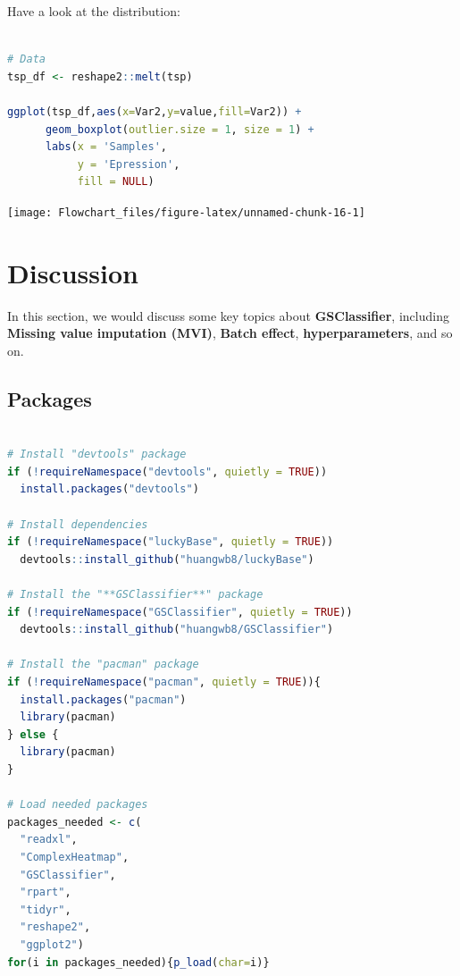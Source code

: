 \documentclass[
  12pt,
]{book}
\begin{document}
Have a look at the distribution:

\begin{lstlisting}[language=R]

# Data
tsp_df <- reshape2::melt(tsp)

ggplot(tsp_df,aes(x=Var2,y=value,fill=Var2)) + 
      geom_boxplot(outlier.size = 1, size = 1) + 
      labs(x = 'Samples',
           y = 'Epression',
           fill = NULL) 
\end{lstlisting}

\begin{center}\texttt{[image: Flowchart\_files/figure-latex/unnamed-chunk-16-1]} \end{center}

\hypertarget{discussion}{%
\chapter{Discussion}\label{discussion}}

In this section, we would discuss some key topics about \textbf{GSClassifier}, including \textbf{Missing value imputation (MVI)}, \textbf{Batch effect}, \textbf{hyperparameters}, and so on.

\hypertarget{packages-1}{%
\section{Packages}\label{packages-1}}

\begin{lstlisting}[language=R]

# Install "devtools" package
if (!requireNamespace("devtools", quietly = TRUE))
  install.packages("devtools")

# Install dependencies
if (!requireNamespace("luckyBase", quietly = TRUE))
  devtools::install_github("huangwb8/luckyBase")

# Install the "**GSClassifier**" package
if (!requireNamespace("GSClassifier", quietly = TRUE))
  devtools::install_github("huangwb8/GSClassifier")

# Install the "pacman" package
if (!requireNamespace("pacman", quietly = TRUE)){
  install.packages("pacman")
  library(pacman)
} else {
  library(pacman)
}

# Load needed packages
packages_needed <- c(
  "readxl",
  "ComplexHeatmap",
  "GSClassifier",
  "rpart",
  "tidyr",
  "reshape2",
  "ggplot2")
for(i in packages_needed){p_load(char=i)}
\end{lstlisting}
\end{document}
